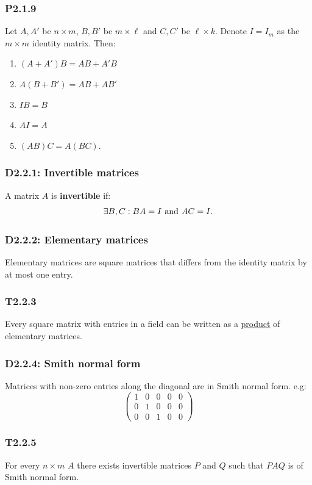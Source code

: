 \documentclass{article}
\begin{document}
\begin{multicols*}{3}
\subsubsection*{P2.1.9}
Let $A,A'$ be $n\times m$,
$B,B'$ be $m\times\ell$ and
$C,C'$ be $\ell\times k$.
Denote $I=I_m$
as the $m\times m$ identity matrix. Then:
\begin{enumerate}
    \item $(A+A')B=AB+A'B$
    \item $A(B+B')=AB+AB'$
    \item $IB=B$
    \item $AI=A$
    \item $(AB)C=A(BC)$.
\end{enumerate}

\subsubsection*{D2.2.1: Invertible matrices}
A matrix $A$ is \textbf{invertible} if:
$$\exists B,C:
BA=I\hspace{0.05in}\text{and}\hspace{0.05in}AC=I.$$

\subsubsection*{D2.2.2: Elementary matrices}
Elementary matrices are square matrices that differs from
the identity matrix by at most one entry.

\subsubsection*{T2.2.3}
Every square matrix with entries in a field can be written
as a \underline{product} of elementary matrices.

\subsubsection*{D2.2.4: Smith normal form}
Matrices with non-zero entries along the diagonal are
in Smith normal form. e.g:
$$\begin{pmatrix}
    1 & 0 & 0 & 0 & 0 \\
    0 & 1 & 0 & 0 & 0 \\
    0 & 0 & 1 & 0 & 0
\end{pmatrix}$$

\subsubsection*{T2.2.5}
For every $n\times m$ $A$
there exists invertible matrices $P$ and $Q$ 
such that $PAQ$ is of Smith normal form.


\end{multicols*}
\end{document}
